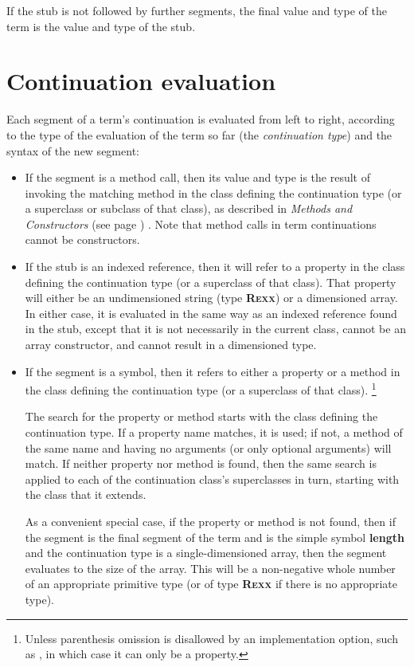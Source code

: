 If the stub is not followed by further segments, the final value and
type of the term is the value and type of the stub.
\section{Continuation evaluation}
 
Each segment of a term's continuation is evaluated from left to right,
according to the type of the evaluation of the term so far (the
\emph{continuation type}) and the syntax of the new segment:
\begin{itemize}
\item 
If the segment is a method call, then its value and type is the result
of invoking the matching method in the class defining the continuation
type (or a superclass or subclass of that class), as described in
 \emph{Methods and Constructors} (see page \pageref{refmethcon}) .
Note that method calls in term continuations cannot be constructors.
\item 
If the stub is an indexed reference, then it will refer to a property
in the class defining the continuation type (or a superclass of that
class).
That property will either be an undimensioned \nr{} string
(type \textbf{R\textsc{exx}}) or a dimensioned array.  In either case, it is
evaluated in the same way as an indexed reference found in the stub,
except that it is not necessarily in the current class, cannot
be an array constructor, and cannot result in a dimensioned type.
\item 
If the segment is a symbol, then it refers to either a property
or a method in the class defining the continuation type (or a superclass
of that class).
\footnote{
Unless parenthesis omission is disallowed by an implementation option,
such as , in which case it can only be a
property.
}
 
The search for the property or method starts with the class defining the
continuation type.  If a property name matches, it is used; if not, a
method of the same name and having no arguments (or only optional
arguments) will match.
If neither property nor method is found, then the same search is applied
to each of the continuation class's superclasses in turn, starting with
the class that it extends.
 
As a convenient special case, if the property or method is not found,
then if the segment is the final segment of the term and is the simple
symbol \textbf{length} and the continuation type is a
single-dimensioned array, then the segment evaluates to the size of the
array.
This will be a non-negative whole number of an appropriate primitive
type (or of type \textbf{R\textsc{exx}} if there is no appropriate
type).
\end{itemize}
 
